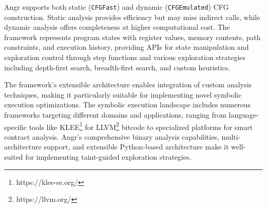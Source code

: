 Angr supports both static (\texttt{CFGFast}) and dynamic (\texttt{CFGEmulated}) CFG construction. Static analysis provides efficiency but may miss indirect calls, while dynamic analysis offers completeness at higher computational cost. The framework represents program states with register values, memory contents, path constraints, and execution history, providing APIs for state manipulation and exploration control through step functions and various exploration strategies including depth-first search, breadth-first search, and custom heuristics.

The framework's extensible architecture enables integration of custom analysis techniques, making it particularly suitable for implementing novel symbolic execution optimizations. The symbolic execution landscape includes numerous frameworks targeting different domains and applications, ranging from language-specific tools like KLEE\footnote{https://klee-se.org/} for LLVM\footnote{https://llvm.org/} bitcode to specialized platforms for smart contract analysis. Angr's comprehensive binary analysis capabilities, multi-architecture support, and extensible Python-based architecture make it well-suited for implementing taint-guided exploration strategies.
